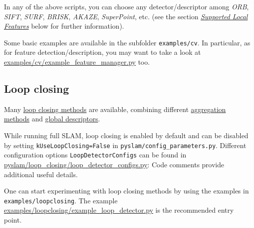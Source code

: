 \documentclass{article}
\newenvironment{Shaded}{\begin{snugshade}}{\end{snugshade}}
\newcommand{\BuiltInTok}[1]{\textcolor[rgb]{0.74,0.68,0.62}{#1}}
\newcommand{\CommentTok}[1]{\textcolor[rgb]{0.00,0.40,1.00}{\textbf{\textit{#1}}}}
\newcommand{\ExtensionTok}[1]{\textcolor[rgb]{0.74,0.68,0.62}{#1}}
\newcommand{\NormalTok}[1]{\textcolor[rgb]{0.74,0.68,0.62}{#1}}
\begin{document}
\begin{scriptsize}
\begin{Shaded}
\end{Shaded}
\end{scriptsize}


In any of the above scripts, you can choose any detector/descriptor
among \emph{ORB}, \emph{SIFT}, \emph{SURF}, \emph{BRISK}, \emph{AKAZE},
\emph{SuperPoint}, etc. (see the section
\emph{\protect\hyperlink{supported-local-features}{Supported Local
Features}} below for further information).

Some basic examples are available in the subfolder
\texttt{examples/cv}. In particular, as for feature
detection/description, you may want to take a look at
\href{https://github.com/luigifreda/pyslam/blob/master/examples/cv/example_feature_manager.py}{examples/cv/example\_feature\_manager.py}
too.

\hypertarget{loop-closing}{%
\subsection{Loop closing}\label{loop-closing}}

Many \protect\hyperlink{loop-closing}{loop closing methods} are
available, combining different
\protect\hyperlink{local-descriptor-aggregation-methods}{aggregation
methods} and \protect\hyperlink{global-descriptors}{global descriptors}.

While running full SLAM, loop closing is enabled by default and can be
disabled by setting \texttt{kUseLoopClosing=False} in
\texttt{pyslam/config\_parameters.py}. Different configuration options
\texttt{LoopDetectorConfigs} can be found in
\href{https://github.com/luigifreda/pyslam/blob/master/pyslam/loop_closing/loop_detector_configs.py}{pyslam/loop\_closing/loop\_detector\_configs.py}: Code comments provide additional useful details.

One can start experimenting with loop closing methods by using the
examples in \texttt{examples/loopclosing}. The example
\href{https://github.com/luigifreda/pyslam/blob/master/examples/loopclosing/example_loop_detector.py}{examples/loopclosing/example\_loop\_detector.py}
is the recommended entry point.
\end{document}
